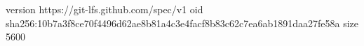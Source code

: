 version https://git-lfs.github.com/spec/v1
oid sha256:10b7a3f8ce70f4496d62ae8b81a4c3e4facf8b83c62c7ea6ab1891daa27fe58a
size 5600
